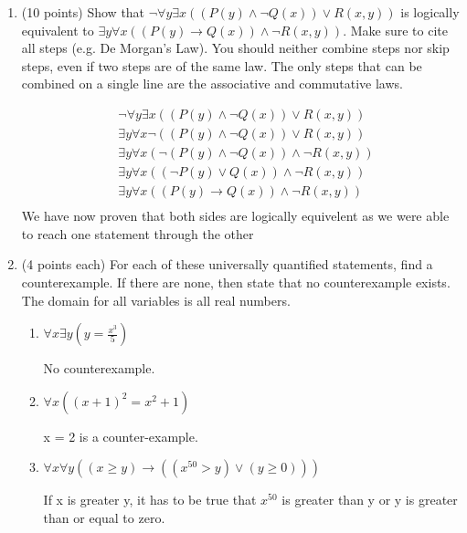 \documentclass[11pt]{article}
\newcommand{\pt}[1]{\textcolor{maincolor}{(#1 points)}}
\newcommand{\pte}[1]{\textcolor{maincolor}{(#1 points each)}}
\begin{document}
\begin{justify}
\begin{enumerate}
    \item \pt{10} Show that $\neg \forall y \exists x ((P(y) \land \neg Q(x)) \lor R(x, y))$ is logically equivalent to $\exists y \forall x ((P(y) \rightarrow Q(x)) \land \neg R(x, y))$. Make sure to cite all steps (e.g. De Morgan's Law). You should neither combine steps nor skip steps, even if two steps are of the same law. The only steps that can be combined on a single line are the associative and commutative laws.
    \begin{mdframed}
        \begin{align*}
            &\neg \forall y \exists x ((P(y) \land \neg Q(x))  \lor R(x, y)) \tag{given} \\
            &\exists y \forall x \neg ((P(y) \land \neg Q(x))  \lor R(x, y)) \tag{de morgans law for quantifiers} \\
            &\exists y \forall x (\neg (P(y) \land \neg Q(x)) \land \neg R(x, y)) \tag{de morgans law} \\
            &\exists y \forall x ((\neg P(y) \lor Q(x)) \land \neg R(x,y)) \tag{de morgans law} \\
            &\exists y \forall x ((P(y) \rightarrow Q(x)) \land \neg R(x, y)) \tag{conditional disjunction law} \\
        \end{align*}
        We have now proven that both sides are logically equivelent as we were able to reach one statement through the other
    \end{mdframed}

    \item \pte{4} For each of these universally quantified statements, find a counterexample. If there are none, then state that no counterexample exists. The domain for all variables is all real numbers.
    
    \begin{enumerate}
        \item $\forall x \exists y (y = \frac{x^3}{5})$
        \begin{mdframed}
            No counterexample.
        \end{mdframed}
        \item $\forall x ((x+1)^2 = x^2 + 1)$
        \begin{mdframed}
            x = 2 is a counter-example.
        \end{mdframed}
        \item $\forall x \forall y ((x \geq y) \rightarrow ((x^{50} > y) \lor (y \geq 0)))$
        \begin{mdframed}
            If x is greater y, it has to be true that $x^50$ is greater than y or y is greater than or equal to zero.
        \end{mdframed}
    \end{enumerate}


\end{enumerate}
\end{justify}
\end{document}
